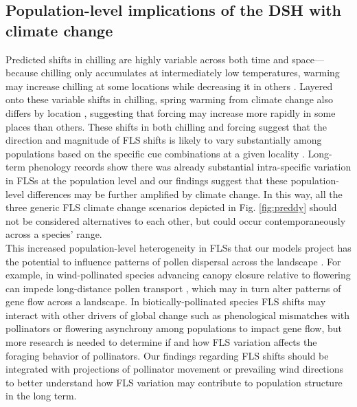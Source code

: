 \documentclass[12pt]{article}\usepackage[]{graphicx}\usepackage[]{color}
\begin{document}
\subsection*{Population-level implications of the DSH with climate change} 
\noindent Predicted shifts in chilling are highly variable across both time and space---because chilling only accumulates at intermediately low temperatures, warming may increase chilling at some locations while decreasing it in others \citep{Man2017,Zhang:2007aa}. Layered onto these variable shifts in chilling, spring warming from climate change also differs by location \citep{Karmalkar:2017aa,Loarie:2009aa}, suggesting that forcing may increase more rapidly in some places than others. These shifts in both chilling and forcing suggest that the direction and magnitude of FLS shifts is likely to vary substantially among populations based on the specific cue combinations at a given locality \citep{Chmielewski:2012aa}. Long-term phenology records show there was already substantial intra-specific variation in FLSs at the population level \citep{Buonaiuto2020} and our findings suggest that these population-level differences may be further amplified by climate change. In this way, all the three generic FLS climate change scenarios depicted in Fig. \ref{fig:preddy} should not be considered alternatives to each other, but could occur contemporaneously across a species' range. \\ 

\noindent This increased population-level heterogeneity in FLSs that our models project has the potential to influence patterns of pollen dispersal across the landscape \citep{Borycka2017,Pace:2018aa}. For example, in wind-pollinated species advancing canopy closure relative to flowering can impede long-distance pollen transport \citep{Milleron2012}, which may in turn alter patterns of gene flow across a landscape. In biotically-pollinated species FLS shifts may interact with other drivers of global change such as phenological mismatches with pollinators \citep{Burkle:2013aa} or flowering asynchrony among populations \citep{Cresti:2013aa,Zohner:2018aa} to impact gene flow, but more research is needed to determine if and how FLS variation affects the foraging behavior of pollinators. Our findings regarding FLS shifts should be integrated with projections of pollinator movement or prevailing wind directions \citep{Kling:2020aa} to better understand how FLS variation may contribute to population structure in the long term. \\
\end{document}
